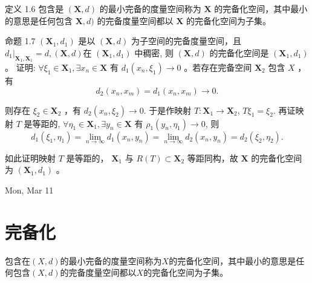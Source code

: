 定义 1.6
包含是 $(\mathbf{X}, d)$ 的最小完备的度量空间称为 $\mathbf{X}$ 的完备化空间，其中最小的意思是任何包含 $\mathbf{X}, d)$ 的完备度量空间都以 $\mathbf{X}$ 的完备化空间为子集。

命题 1.7
$\left(\mathbf{X}_1, d_1\right)$ 是以 $(\mathbf{X}, d)$ 为子空间的完备度量空间，且 $\left.d_1\right|_{\mathbf{X}_1, \mathbf{X}_1}=d,(\mathbf{X}, d)$在 $\left(\mathbf{X}_1, d_1\right)$ 中稠密, 则 $(\mathbf{X}, d)$ 的完备化空间是 $\left(\mathbf{X}_1, d_1\right)$ 。
证明: $\forall \xi_1 \in \mathbf{X}_1, \exists x_n \in \mathbf{X}$ 有 $d_1\left(x_n, \xi_1\right) \rightarrow 0$ 。若存在完备空间 $\mathbf{X}_2$ 包含 $X$ ，有
$$
d_2\left(x_n, x_m\right)=d_1\left(x_n, x_m\right) \rightarrow 0 .
$$

则存在 $\xi_2 \in \mathbf{X}_2$ ，有 $d_2\left(x_n, \xi_2\right) \rightarrow 0$. 于是作映射 $T: \mathbf{X}_1 \rightarrow \mathbf{X}_2$,
$T \xi_1=\xi_2$. 再证映射 $T$ 是等距的, $\forall \eta_1 \in \mathbf{X}_1, \exists y_n \in \mathbf{X}$ 有 $\rho_1\left(y_n, \eta_1\right) \rightarrow 0$, 则
$$
d_1\left(\xi_1, \eta_1\right)=\lim _{n \rightarrow \infty} d_1\left(x_n, y_n\right)=\lim _{n \rightarrow \infty} d_2\left(x_n, y_n\right)=d_2\left(\xi_2, \eta_2\right) .
$$

如此证明映射 $T$ 是等距的， $\mathbf{X}_1$ 与 $R(T) \subset \mathbf{X}_2$ 等距同构，故 $\mathbf{X}$ 的完备化空间为 $\left(\mathbf{X}_1, d_1\right)$ 。

\newpage
\begin{center}
    Mon, Mar 11
\end{center}
\section{完备化}
\begin{definition}[完备化空间]
    包含在$(X, d)$的最小完备的度量空间称为$X$的完备化空间，其中最小的意思是任何包含$(X, d)$的完备度量空间都以$X$的完备化空间为子集。
\end{definition}

